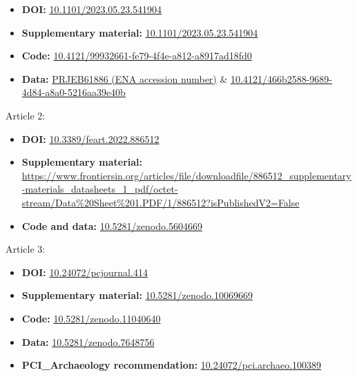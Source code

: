 \documentclass[
  b5paper,
]{book}
\providecommand{\tightlist}{%
  \setlength{\itemsep}{0pt}\setlength{\parskip}{0pt}}
\begin{document}
\begin{itemize}
\tightlist
\item
  \textbf{DOI:}
  \href{https://doi.org/10.1101/2023.05.23.541904}{10.1101/2023.05.23.541904}
\item
  \textbf{Supplementary material:}
  \href{https://doi.org/10.1101/2023.05.23.541904}{10.1101/2023.05.23.541904}
\item
  \textbf{Code:}
  \href{https://doi.org/10.4121/99932661-fe79-4f4e-a812-a8917ad18fd0}{10.4121/99932661-fe79-4f4e-a812-a8917ad18fd0}
\item
  \textbf{Data:}
  \href{https://www.ebi.ac.uk/ena/browser/view/PRJEB61886}{PRJEB61886
  (ENA accession number)} \&
  \href{https://doi.org/10.4121/466b2588-9689-4d84-a8a0-5216aa39e40b}{10.4121/466b2588-9689-4d84-a8a0-5216aa39e40b}
\end{itemize}

Article 2:

\begin{itemize}
\tightlist
\item
  \textbf{DOI:}
  \href{https://doi.org/10.3389/feart.2022.886512}{10.3389/feart.2022.886512}
\item
  \textbf{Supplementary material:}
  \url{https://www.frontiersin.org/articles/file/downloadfile/886512_supplementary-materials_datasheets_1_pdf/octet-stream/Data\%20Sheet\%201.PDF/1/886512?isPublishedV2=False}
\item
  \textbf{Code and data:}
  \href{https://doi.org/10.5281/zenodo.5604669}{10.5281/zenodo.5604669}
\end{itemize}

Article 3:

\begin{itemize}
\tightlist
\item
  \textbf{DOI:}
  \href{https://doi.org/10.24072/pcjournal.414}{10.24072/pcjournal.414}
\item
  \textbf{Supplementary material:}
  \href{https://doi.org/10.5281/zenodo.10069669}{10.5281/zenodo.10069669}
\item
  \textbf{Code:}
  \href{https://doi.org/10.5281/zenodo.11040640}{10.5281/zenodo.11040640}
\item
  \textbf{Data:}
  \href{https://doi.org/10.5281/zenodo.7648756}{10.5281/zenodo.7648756}
\item
  \textbf{PCI\_Archaeology recommendation:}
  \href{https://doi.org/10.24072/pci.archaeo.100389}{10.24072/pci.archaeo.100389}
\end{itemize}
\end{document}
